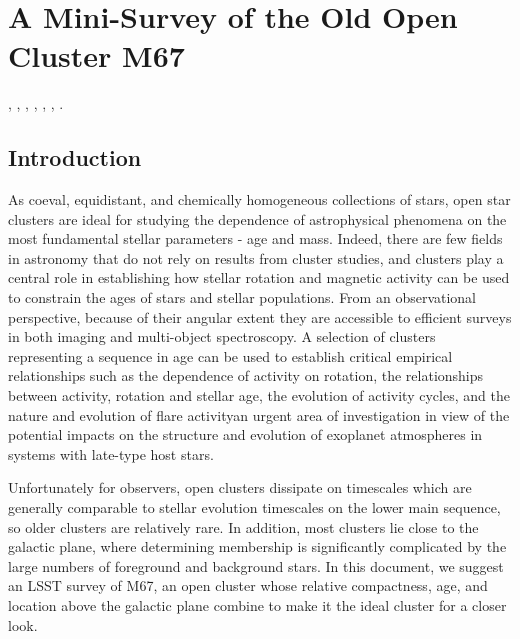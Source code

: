 %
%
%

\section{A Mini-Survey of the Old Open Cluster M67}
\def\secname{M67_special}\label{sec:\secname}

,
,
,
,
,
,
.

\subsection{Introduction}

As coeval, equidistant, and chemically homogeneous collections of stars, open
star clusters are ideal for studying the dependence of astrophysical phenomena
on the most fundamental stellar parameters - age and mass.
Indeed, there are few fields in astronomy that do not rely on results from
cluster studies, and clusters play a central role in establishing how stellar
rotation and magnetic activity can be used to constrain the ages of stars and
stellar populations.
From an observational perspective, because of their angular extent they are
accessible to efficient surveys in both imaging and multi-object spectroscopy.
A selection of clusters representing a sequence in age can be used to
establish critical empirical relationships such as the dependence of activity
on rotation, the relationships between activity, rotation and stellar age, the
evolution of activity cycles, and the nature and evolution of flare
activity\textemdash{}an urgent area of investigation in view of the potential
impacts on the structure and evolution of exoplanet atmospheres in systems
with late-type host stars.

Unfortunately for observers, open clusters dissipate on timescales which are
generally comparable to stellar evolution timescales on the lower main
sequence, so older clusters are relatively rare.
In addition, most clusters lie close to the galactic plane, where determining
membership is significantly complicated by the large numbers of foreground and
background stars.
In this document, we suggest an LSST survey of M67, an open cluster whose
relative compactness, age, and location above the galactic plane combine to
make it the ideal cluster for a closer look.

